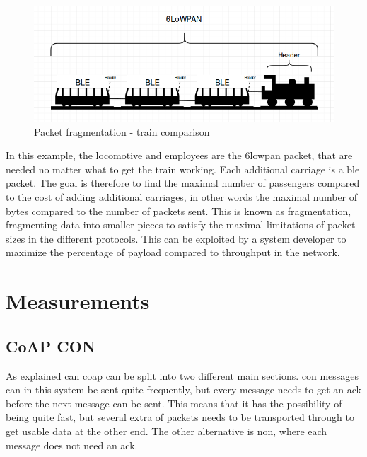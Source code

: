 \begin{figure}[ht]
    \centering
    \includegraphics[scale=0.5]{trainExample.png}    
    \caption{Packet fragmentation - train comparison}
    \label{fig:trainExample}
\end{figure}

\noindent In this example, the locomotive and employees are the \gls{6lowpan} packet, that are needed no matter what to get the train working. Each additional carriage is a \gls{ble} packet. The goal is therefore to find the maximal number of passengers compared to the cost of adding additional carriages, in other words the maximal number of bytes compared to the number of packets sent. This is known as fragmentation, fragmenting data into smaller pieces to satisfy the maximal limitations of packet sizes in the different protocols. This can be exploited by a system developer to maximize the percentage of \gls{payload} compared to \gls{throughput} in the network.
 
\newpage

\section{Measurements}

\subsection{CoAP CON}

\noindent As explained can \gls{coap} can be split into two different main sections. \gls{con} messages can in this system be sent quite frequently, but every message needs to get an \gls{ack} before the next message can be sent. This means that it has the possibility of being quite fast, but several extra of packets needs to be transported through to get usable data at the other end. The other alternative is \gls{non}, where each message does not need an \gls{ack}. 





